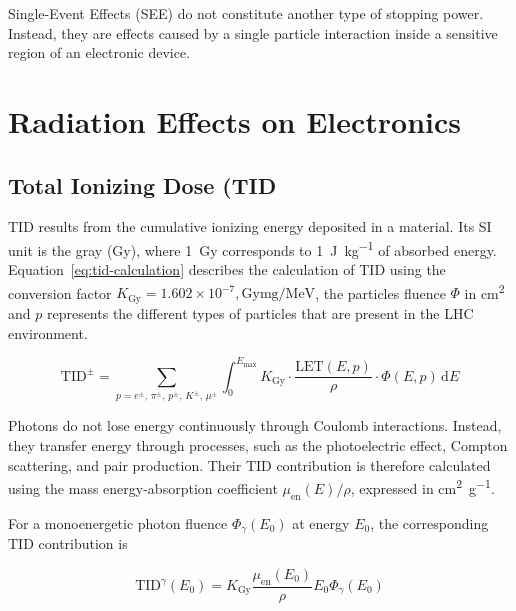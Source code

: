 Single-Event Effects (SEE) do not constitute another type of stopping power. Instead, they are effects caused by a single particle interaction inside a sensitive region of an electronic device.

\section{Radiation Effects on Electronics}
\label{section:radiation-effects-electronics}

\subsection{Total Ionizing Dose (TID}
\label{subsection:tid}

TID results from the cumulative ionizing energy deposited in a material. Its SI unit is the gray (\si{\gray}), where \SI{1}{\gray} corresponds to \SI{1}{\joule\per\kilogram} of absorbed energy. Equation~\ref{eq:tid-calculation} describes the calculation of TID using the conversion factor $K_{\mathrm{Gy}} = 1.602\times10^{-7},\si{\gray\milli\gram\per\mega\electronvolt}$, the particles fluence $\Phi$ in \si{\centi\metre\squared} and $p$ represents the different types of particles that are present in the LHC environment.

\begin{equation}
    \mathrm{TID}^\pm
    =
    \sum_{p=e^{\pm},\,\pi^{\pm},\,p^{\pm},\,K^{\pm},\,\mu^{\pm}}
    \int_{0}^{E_{\max}}
    K_{\mathrm{Gy}}
    \cdot
    \frac{\mathrm{LET}(E,p)}{\rho}
    \cdot
    \Phi(E,p)
    \,\mathrm{d}E
    \label{eq:tid-calculation}
\end{equation}

Photons do not lose energy continuously through Coulomb interactions. Instead, they transfer energy through processes, such as the photoelectric effect, Compton scattering, and pair production. Their TID contribution is therefore calculated using the mass energy-absorption coefficient $\mu_{\mathrm{en}}(E)/\rho$, expressed in \si{\square\centi\metre\per\gram}.

For a monoenergetic photon fluence $\Phi_{\gamma}(E_0)$ at energy $E_0$, the corresponding TID contribution is

\begin{equation}
    \mathrm{TID}^{\gamma}(E_0) = K_{\mathrm{Gy}} \frac{\mu_{\mathrm{en}}(E_0)}{\rho} E_0 \Phi_{\gamma}(E_0)
    \label{eq:monoenergetic-photon-tid} 
\end{equation}

